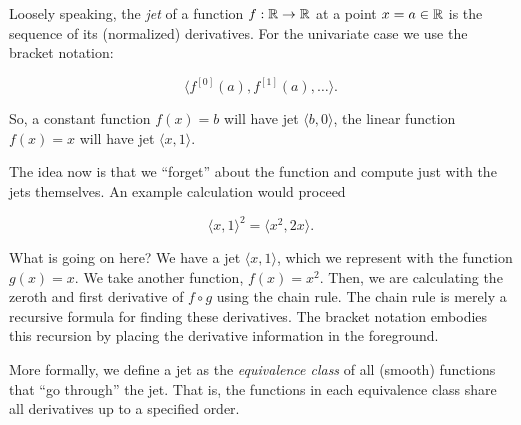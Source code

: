 \documentclass[11pt]{article}
\begin{document}
Loosely speaking, the {\it jet} of a function $f:\mathbb{R}\to\mathbb{R}$
at a point $x=a\in\mathbb{R}$ is the sequence of its (normalized) derivatives.
For the univariate case we use the bracket notation:

$$
    \langle f^{[{0}]}(a),  f^{[{1}]}(a), \dots \rangle.
$$

So, a constant function $f(x)=b$ will have
jet  $\langle b, 0\rangle$, the linear function
$f(x)=x$ will
have jet $\langle x, 1 \rangle$. 


The idea now is that we ``forget'' about the function
and compute just with the jets themselves.
An example calculation would proceed 

$$
    \langle x, 1 \rangle^2 = \langle x^2, 2x \rangle. 
$$

What is going on here?
We have a jet $\langle x, 1\rangle$, 
which we represent with the function $g(x)=x$.
We take another function, $f(x)=x^2$.
Then, we are calculating the zeroth and first derivative
of $f\circ g$ using the chain rule.
The chain rule is merely a recursive formula for finding these
derivatives.
The bracket notation embodies this recursion
by placing the derivative information in the foreground.


More formally, we define a jet as the {\it equivalence class} of all (smooth) functions
that ``go through'' the jet. 
That is, the functions in each equivalence class share all derivatives
up to a specified order.
\end{document}
